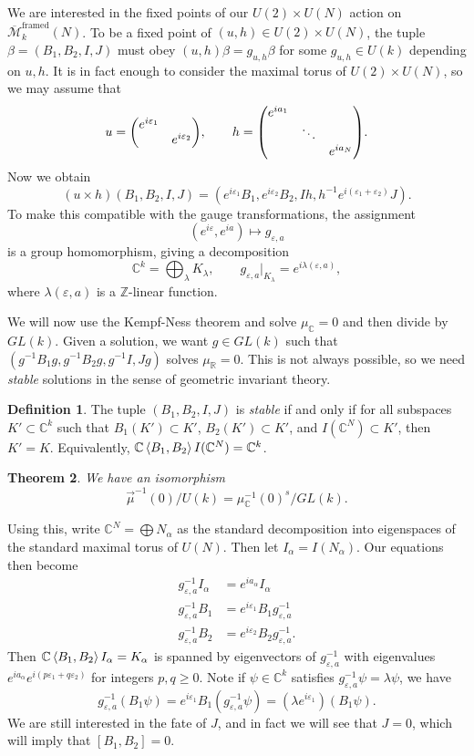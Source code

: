 \documentclass[leqno, openany]{memoir}
\newtheorem{thm}{Theorem}[section]
\theoremstyle{definition}
\newtheorem{defn}[thm]{Definition}
\theoremstyle{remark}
\theoremstyle{plain}
\theoremstyle{definition}
\theoremstyle{remark}
\newcommand{\R}{\mathbb{R}}
\newcommand{\C}{\mathbb{C}}
\newcommand{\Z}{\mathbb{Z}}
\newcommand{\ep}{\varepsilon}
\newcommand{\mc}[1]{\mathcal{#1}}
\newcommand{\mr}[1]{\mathrm{#1}}
\newcommand{\ol}[1]{\overline{#1}}
\begin{document}
We are interested in the fixed points of our $U(2) \times U(N)$ action on $\ol{\mc{M}}_k^{\mr{framed}}(N)$. To be a fixed point of $(u,h) \in U(2) \times U(N)$, the tuple $\beta = (B_1, B_2, I, J)$ must obey $(u,h) \beta = g_{u,h} \beta$ for some $g_{u,h} \in U(k)$ depending on $u,h$. It is in fact enough to consider the maximal torus of $U(2) \times U(N)$, so we may assume that
\[ u = \mqty(\dmat{e^{i\ep_1}, e^{i\ep_2}}), \qquad h = \mqty(\dmat{e^{ia_1},\ddots,e^{ia_N}}). \]
Now we obtain
\[ (u \times h)(B_1, B_2, I, J) = (e^{i\ep_1} B_1, e^{i\ep_2} B_2, Ih, h^{-1} e^{i(\ep_1+\ep_2)}J). \]
To make this compatible with the gauge transformations, the assignment
\[ (e^{i\ep}, e^{ia}) \mapsto g_{\ep, a} \]
is a group homomorphism, giving a decomposition
\[ \C^k = \bigoplus_{\lambda} K_{\lambda}, \qquad g_{\ep, a}|_{K_{\lambda}} = e^{i\lambda(\ep, a)}, \]
where $\lambda(\ep, a)$ is a $\Z$-linear function.

We will now use the Kempf-Ness theorem and solve $\mu_{\C} = 0$ and then divide by $GL(k)$. Given a solution, we want $g \in GL(k)$ such that $(g^{-1} B_1 g, g^{-1} B_2 g, g^{-1} I, Jg)$ solves $\mu_{\R} = 0$. This is not always possible, so we need \textit{stable} solutions in the sense of geometric invariant theory.

\begin{defn}
    The tuple $(B_1, B_2, I, J)$ is \textit{stable} if and only if for all subspaces $K' \subset \C^k$ such that $B_1(K') \subset K'$, $B_2(K') \subset K'$, and $I(\C^N) \subset K'$, then $K' = K$. Equivalently, $\C\ev{B_1, B_2} I(\C^N) = \C^k$.
\end{defn}

\begin{thm}
    We have an isomorphism
    \[ \vec{\mu}^{-1}(0) / U(k) = \mu_{\C}^{-1}(0)^s / GL(k). \]
\end{thm}

Using this, write $\C^N = \bigoplus N_{\alpha}$ as the standard decomposition into eigenspaces of the standard maximal torus of $U(N)$. Then let $I_{\alpha} = I(N_{\alpha})$. Our equations then become
\begin{align*}
    g^{-1}_{\ep, a} I_{\alpha} &= e^{i a_{\alpha}} I_{\alpha} \\
    g^{-1}_{\ep, a} B_1 &= e^{i \ep_1} B_1 g_{\ep, a}^{-1} \\
    g^{-1}_{\ep, a} B_2 &= e^{i \ep_2} B_2 g_{\ep, a}^{-1} .
\end{align*}
Then $\C\ev{B_1, B_2} I_{\alpha} = K_{\alpha}$ is spanned by eigenvectors of $g^{-1}_{\ep, a}$ with eigenvalues $e^{i a_{\alpha}} e^{i(p \ep_1 + q \ep_2)}$ for integers $p,q \geq 0$. Note if $\psi \in \C^k$ satisfies $g^{-1}_{\ep, a} \psi = \lambda \psi$, we have
\[ g_{\ep, a}^{-1}(B_1 \psi) = e^{i \ep_1} B_1 (g_{\ep, a}^{-1} \psi) = (\lambda e^{i \ep_1})(B_1 \psi). \]
We are still interested in the fate of $J$, and in fact we will see that $J = 0$, which will imply that $[B_1, B_2] = 0$. 
\end{document}
